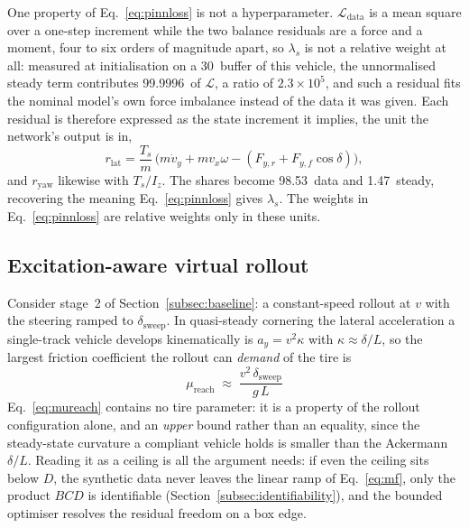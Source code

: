 \documentclass[lineno,12pt]{sn-jnl}
\makeatletter
\newif\ifsiu@prev
\DeclareRobustCommand{\siu@sep}{\ifsiu@prev\,\fi}
\DeclareRobustCommand{\siu@unit}[1]{\siu@sep\text{#1}\siu@prevtrue}
\DeclareRobustCommand{\siu@pre}[1]{\siu@sep\text{#1}\siu@prevfalse}
\DeclareRobustCommand{\siu@div}[1]{\text{#1}\siu@prevfalse}
\DeclareRobustCommand{\meter}{m}
\DeclareRobustCommand{\second}{s}
\DeclareRobustCommand{\gram}{g}
\DeclareRobustCommand{\newton}{N}
\DeclareRobustCommand{\radian}{rad}
\DeclareRobustCommand{\hertz}{Hz}
\DeclareRobustCommand{\percent}{\%}
\DeclareRobustCommand{\g}{\textit{g}}
\DeclareRobustCommand{\kilo}{k}
\DeclareRobustCommand{\milli}{m}
\DeclareRobustCommand{\per}{/}
\DeclareRobustCommand{\squared}{\ensuremath{^{2}}}
\providecommand{\degree}{\ensuremath{^{\circ}}}
\DeclareRobustCommand{\si}[1]{\begingroup
  \siu@prevfalse
  \renewcommand{\meter}{\siu@unit{m}}%
  \renewcommand{\second}{\siu@unit{s}}%
  \renewcommand{\gram}{\siu@unit{g}}%
  \renewcommand{\newton}{\siu@unit{N}}%
  \renewcommand{\radian}{\siu@unit{rad}}%
  \renewcommand{\hertz}{\siu@unit{Hz}}%
  \renewcommand{\percent}{\siu@unit{\%}}%
  \renewcommand{\degree}{\siu@unit{\ensuremath{^{\circ}}}}%
  \renewcommand{\g}{\siu@unit{\textit{g}}}%
  \renewcommand{\kilo}{\siu@pre{k}}%
  \renewcommand{\milli}{\siu@pre{m}}%
  \renewcommand{\per}{\siu@div{/}}%
  \renewcommand{\squared}{\ensuremath{^{2}}}%
  #1\endgroup}
\DeclareRobustCommand{\num}[1]{#1}
\DeclareRobustCommand{\SI}[2]{#1\,\si{#2}}
\newcommand{\Fyf}{F_{y,f}}
\newcommand{\Fyr}{F_{y,r}}
\theoremstyle{thmstyleone}%
\theoremstyle{thmstyletwo}%
\theoremstyle{thmstylethree}%
\makeatother
\begin{document}
One property of Eq.~\eqref{eq:pinnloss} is not a hyperparameter.
$\mathcal{L}_{\mathrm{data}}$ is a mean square over a one-step increment while
the two balance residuals are a force and a moment, four to six orders of
magnitude apart, so $\lambda_{s}$ is not a relative weight at all: measured at
initialisation on a \SI{30}{\second} buffer of this vehicle, the unnormalised
steady term contributes \SI{99.9996}{\percent} of $\mathcal{L}$, a ratio of
$\num{2.3}\times10^{5}$, and such a residual fits the nominal model's own force imbalance
instead of the data it was given. Each residual is therefore expressed as the
state increment it implies, the unit the network's output is in,
\begin{equation}
r_{\mathrm{lat}}=\frac{T_{s}}{m}\,\Big(m\dot v_{y}+mv_{x}\omega-(\Fyr+\Fyf\cos\delta)\Big),
\label{eq:physnorm}
\end{equation}
and $r_{\mathrm{yaw}}$ likewise with $T_{s}/I_{z}$. The shares become
\SI{98.53}{\percent} data and \SI{1.47}{\percent} steady, recovering the meaning
Eq.~\eqref{eq:pinnloss} gives $\lambda_{s}$. The weights in Eq.~\eqref{eq:pinnloss} are
relative weights only in these units.

\subsection{Excitation-aware virtual rollout}
\label{subsec:excitation}

Consider stage~2 of
Section~\ref{subsec:baseline}: a constant-speed rollout at $v$ with the steering
ramped to $\delta_{\mathrm{sweep}}$. In quasi-steady cornering the lateral
acceleration a single-track vehicle develops kinematically is
$a_{y}=v^{2}\kappa$ with $\kappa\approx\delta/L$, so the largest friction
coefficient the rollout can \emph{demand} of the tire is
\begin{equation}
\boxed{\;\mu_{\mathrm{reach}}\;\approx\;\frac{v^{2}\,\delta_{\mathrm{sweep}}}{g\,L}\;}
\label{eq:mureach}
\end{equation}
Eq.~\eqref{eq:mureach} contains no tire parameter: it is a property of the
rollout configuration alone, and an \emph{upper} bound rather than an equality,
since the steady-state curvature a compliant vehicle holds is smaller than the
Ackermann $\delta/L$. Reading it as a ceiling is all the argument needs: if even
the ceiling sits below $D$, the synthetic data never leaves the linear ramp of
Eq.~\eqref{eq:mf}, only the product $BCD$ is identifiable
(Section~\ref{subsec:identifiability}), and the bounded optimiser resolves the
residual freedom on a box edge.
\end{document}
